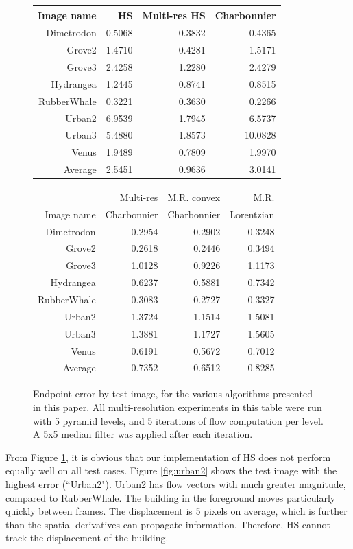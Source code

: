 \documentclass[10pt,twocolumn,letterpaper]{article}
\begin{document}
\begin{figure}
\begin{tabular} {|r | r | r| r |}
\hline
Image name & HS & Multi-res HS & Charbonnier \\
\hline 
Dimetrodon & 0.5068 &  0.3832 & 0.4365 \\
Grove2 & 1.4710 & 0.4281 & 1.5171\\
Grove3 &  2.4258 & 1.2280 & 2.4279\\
Hydrangea & 1.2445 & 0.8741 & 0.8515\\
RubberWhale & 0.3221 & 0.3630 & 0.2266\\
Urban2 & 6.9539 & 1.7945 & 6.5737\\
Urban3 & 5.4880 & 1.8573 & 10.0828\\
Venus & 1.9489 & 0.7809 & 1.9970\\
\hline
Average & 2.5451 & 0.9636 & 3.0141 \\
\hline

\end{tabular}
\begin{tabular} {|r | r | r| r|}
\hline
& Multi-res & M.R. convex & M.R. \\
Image name & Charbonnier & Charbonnier & Lorentzian \\
\hline 
Dimetrodon & 0.2954 & 0.2902 & 0.3248 \\
Grove2 & 0.2618 & 0.2446 & 0.3494 \\
Grove3 & 1.0128 & 0.9226 & 1.1173\\
Hydrangea & 0.6237 & 0.5881 & 0.7342  \\
RubberWhale & 0.3083 & 0.2727 & 0.3327 \\
Urban2 & 1.3724 & 1.1514 & 1.5081 \\
Urban3 & 1.3881 & 1.1727 & 1.5605\\
Venus & 0.6191 & 0.5672 & 0.7012\\
\hline
Average & 0.7352 & 0.6512 & 0.8285 \\
\hline


\end{tabular}

\caption{Endpoint error by test image, for the various algorithms presented in this paper.  All multi-resolution experiments in this table were run with 5 pyramid levels, and 5 iterations of flow computation per level. A 5x5 median filter was applied after each iteration.}
\label{fig:table}
\end{figure}

From Figure \ref{fig:table}, it is obvious that our implementation of HS does not perform equally well on all test cases.  Figure \ref{fig:urban2} shows the test image with the highest error (``Urban2").  Urban2 has flow vectors with much greater magnitude, compared to RubberWhale.  The building in the foreground moves particularly quickly between frames.  The displacement is 5 pixels on average, which is further than the spatial derivatives can propagate information.  Therefore, HS cannot track the displacement of the building.  
\end{document}

